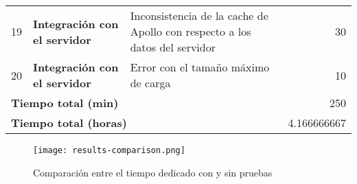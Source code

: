 \begin{table}[]
\begin{adjustbox}{width=\columnwidth,center}
\begin{tabular}{rllr}
19                              & \textbf{Integración con el servidor}            & Inconsistencia de la cache de Apollo con respecto a los datos del servidor         & 30                                                      \\
20                              & \textbf{Integración con el servidor}            & Error con el tamaño máximo de carga                                                & 10                                                      \\
\multicolumn{3}{l}{\textbf{Tiempo total (min)}}                                                                                                                        & 250                                                     \\
\multicolumn{3}{l}{\textbf{Tiempo total (horas)}}                                                                                                                      & 4.166666667
\end{tabular}
\end{adjustbox}
\end{table}

\begin{figure}
  \centering
  \texttt{[image: results-comparison.png]}
  \caption{Comparación entre el tiempo dedicado con y sin pruebas}
  \label{fig:results-comparison}
\end{figure}

